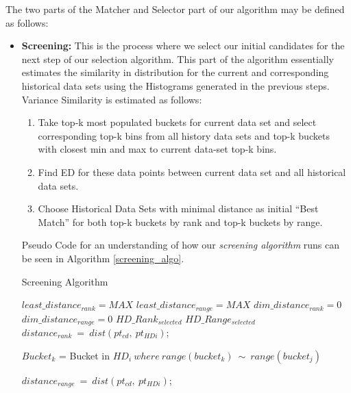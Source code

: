 \documentclass{vldb}
\begin{document}
The two parts of the Matcher and Selector part of our algorithm may be defined as follows:
	\begin{itemize}
	\item \textbf{Screening:} This is the process where we select our initial candidates for the next step of our selection algorithm. This part of the algorithm essentially estimates the similarity in distribution for the current and corresponding historical data sets using the  Histograms generated in the previous steps. Variance Similarity is estimated as follows:			
		\begin{enumerate}
    			\item Take top-k most populated buckets for current data set and select corresponding top-k bins from all history data sets and top-k buckets with closest min and max to current data-set top-k bins.
		    \item Find ED for these data points between current data set and all historical data sets.
    			\item Choose Historical Data Sets with minimal distance as initial “Best Match” for both top-k buckets by rank and top-k buckets by range.
		\end{enumerate}
	Pseudo Code for an understanding of how our \textit{screening algorithm} runs can be seen in Algorithm \ref{screening_algo}.


 
\begin{algorithm}
\caption{Screening Algorithm}
\label{screening_algo}
\begin{algorithmic}[1]
\State $least\_distance_{rank} = MAX$
\State $least\_distance_{range} = MAX$
\State $dim\_distance_{rank} = 0$
\State $dim\_distance_{range} = 0$
\State $HD\_Rank_{selected}$
\State $HD\_Range_{selected}$
			\State 
				\State $distance_{rank}\ =\  dist(pt_{cd},\ pt_{HDi})$;
			\EndFor

			\State$Bucket_k$ = Bucket in $HD_i\  where\ range(bucket_k)\ \sim \  range(bucket_j)$
			
				\State $distance_{range}\ =\ dist(pt_{cd},\ pt_{HDi})$;  
			\EndFor
		\EndFor
 	 		

\end{algorithmic}
\end{algorithm}
\end{itemize}
\end{document}
